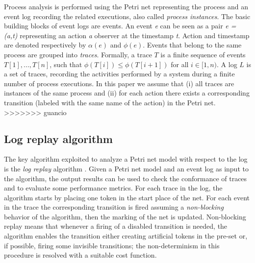\documentclass{llncs}
\begin{document}
Process analysis is performed using the Petri net representing the
process and an event log recording the related executions, also called
\emph{process instances}. The basic building blocks of event logs are
events. An event {\itshape e} can be seen as a pair {\itshape e =
  (a,t) } representing an action {\itshape a } observer at the
timestamp {\itshape t}. Action and timestamp are denoted respectively
by $\alpha(e)$ and $\phi(e)$. Events that belong to the same process
are grouped into {\itshape traces}. Formally, a trace $T$ is a finite
sequence of events $T[1],..., T[n]$, such that $\phi(T[i]) \leq
\phi(T[i+1])$ for all  $i \in [1,n)$. A log $L$ is a set of traces,
recording the activities performed by a system during a finite number
of process executions. In this paper we assume that
(i) all traces are instances of the same process
and
(ii) for each action there exists a corresponding transition (labeled
with the same name of the action) in the Petri net.
>>>>>>> guancio

\subsection{Log replay algorithm}\label{logreplayAlg}
The key algorithm exploited to analyze a Petri net model with respect to the log is the {\itshape log replay} algorithm \cite{13}\cite{3}\cite{4}. Given a Petri net model and an event log as input to the algorithm, the output results can be used to check the conformance of traces and to evaluate some performance metrics. For each trace in the log, the algorithm starts by placing one token in the start place of the net. For each event in the trace the corresponding transition is fired assuming a {\itshape non-blocking} behavior of the algorithm, then the marking of the net is updated. Non-blocking replay means that whenever a firing of a disabled transition is needed, the algorithm enables the transition either creating artificial tokens in the pre-set or, if possible, firing some invisible transitions; the non-determinism in this procedure is resolved with a suitable cost function. %

\end{document}
